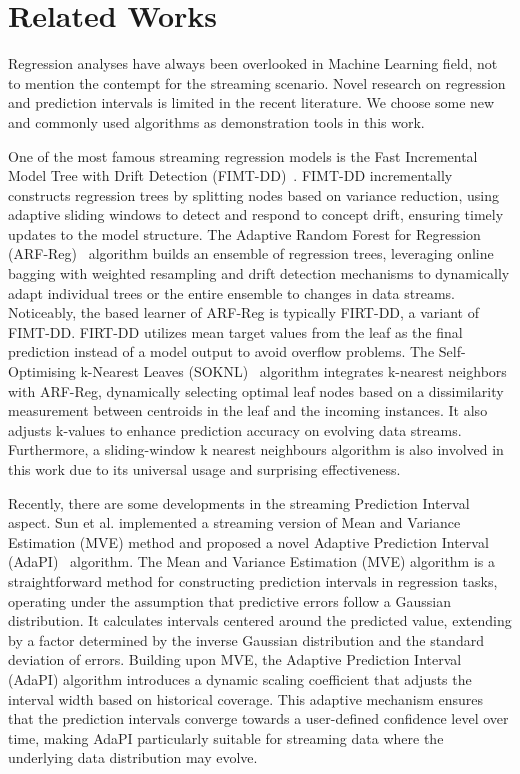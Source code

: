 \section{Related Works}
\label{sec:related}
Regression analyses have always been overlooked in Machine Learning field, not to mention the contempt for the streaming scenario.
Novel research on regression and prediction intervals is limited in the recent literature. 
We choose some new and commonly used algorithms as demonstration tools in this work.

One of the most famous streaming regression models is the Fast Incremental Model Tree with Drift Detection (FIMT-DD)~\cite{ref_fimtdd}. FIMT-DD incrementally constructs regression trees by splitting nodes based on variance reduction, using adaptive sliding windows to detect and respond to concept drift, ensuring timely updates to the model structure.
The Adaptive Random Forest for Regression (ARF-Reg)~\cite{ref_arfreg} algorithm builds an ensemble of regression trees, leveraging online bagging with weighted resampling and drift detection mechanisms to dynamically adapt individual trees or the entire ensemble to changes in data streams. Noticeably, the based learner of ARF-Reg is typically FIRT-DD, a variant of FIMT-DD. FIRT-DD utilizes mean target values from the leaf as the final prediction instead of a model output to avoid overflow problems.
The Self-Optimising k-Nearest Leaves (SOKNL)~\cite{ref_soknl} algorithm integrates k-nearest neighbors with ARF-Reg, dynamically selecting optimal leaf nodes based on a dissimilarity measurement between centroids in the leaf and the incoming instances. It also adjusts k-values to enhance prediction accuracy on evolving data streams.
Furthermore, a sliding-window k nearest neighbours algorithm is also involved in this work due to its universal usage and surprising effectiveness. 

Recently, there are some developments in the streaming Prediction Interval aspect. Sun et al. implemented a streaming version of Mean and Variance Estimation (MVE) method and proposed a novel Adaptive Prediction Interval (AdaPI)~\cite{ref_adapi} algorithm. The Mean and Variance Estimation (MVE) algorithm is a straightforward method for constructing prediction intervals in regression tasks, operating under the assumption that predictive errors follow a Gaussian distribution. It calculates intervals centered around the predicted value, extending by a factor determined by the inverse Gaussian distribution and the standard deviation of errors. Building upon MVE, the Adaptive Prediction Interval (AdaPI) algorithm introduces a dynamic scaling coefficient that adjusts the interval width based on historical coverage. This adaptive mechanism ensures that the prediction intervals converge towards a user-defined confidence level over time, making AdaPI particularly suitable for streaming data where the underlying data distribution may evolve.